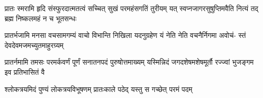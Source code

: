
\fourlineindentedshloka
{प्रातः स्मरामि हृदि संस्फुरदात्मतत्वं}
{सच्चित् सुखं परमहंसगतिं तुरीयम्}
{यत् स्वप्नजागरसुषुप्तिमवैति नित्यं}
{तद् ब्रह्म निष्कलमहं न च भूतसन्धः}

\fourlineindentedshloka
{प्रातर्भजामि मनसा वचसामगम्यं}
{वाचो विभान्ति निखिला यदनुग्रहेण}
{यं नेति नेति वचनैर्निगमा अवोचं-}
{स्तं देवदेवमजमच्युतमाहुरग्र्यम्}

\fourlineindentedshloka
{प्रातर्नमामि तमसः परमर्कवर्णं}
{पूर्णं सनातनपदं पुरुषोत्तमाख्यम्}
{यस्मिन्निदं जगदशेषमशेषमूर्तौ}
{रज्ज्वां भुजङ्गम इव प्रतिभासितं वै}

\twolineshloka
{श्लोकत्रयमिदं पुण्यं लोकत्रयविभूषणम्}
{प्रातःकाले पठेद् यस्तु स गच्छेत् परमं पदम्}

